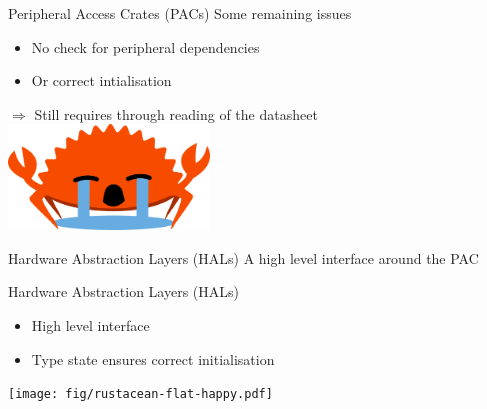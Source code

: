 \documentclass[169]{beamer}
\begin{document}
\begin{frame}{Peripheral Access Crates (PACs)}
    Some remaining issues
    \begin{itemize}
        \item{No check for peripheral dependencies}
        \item{Or correct intialisation}
    \end{itemize}

    $\Rightarrow$ Still requires through reading of the datasheet
    \hspace*{5cm}\includegraphics[width=0.40\textwidth]{fig/ferrisSob.png}
\end{frame}

\begin{frame}[fragile]{Hardware Abstraction Layers (HALs)}
    A high level interface around the PAC

    \begin{linehighlight}{
    }
        
    \end{linehighlight}
\end{frame}

\begin{frame}{Hardware Abstraction Layers (HALs)}
    \begin{itemize}
        \item{High level interface}
        \item{Type state ensures correct initialisation}
    \end{itemize}
    \hspace*{5cm}\texttt{[image: fig/rustacean-flat-happy.pdf]}
\end{frame}
\end{document}
